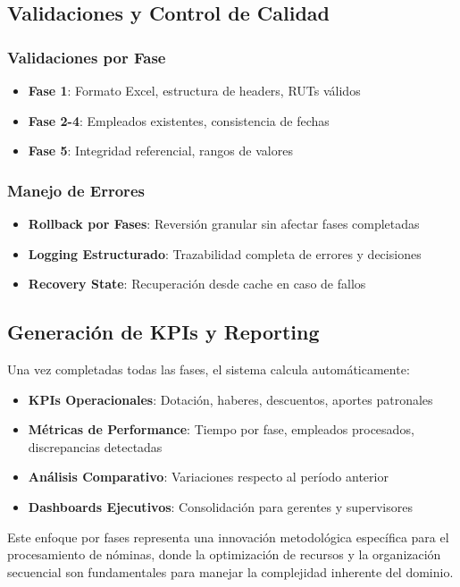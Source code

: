 \subsection{Validaciones y Control de Calidad}

\subsubsection{Validaciones por Fase}
\begin{itemize}
    \item \textbf{Fase 1}: Formato Excel, estructura de headers, RUTs válidos
    \item \textbf{Fase 2-4}: Empleados existentes, consistencia de fechas
    \item \textbf{Fase 5}: Integridad referencial, rangos de valores
\end{itemize}

\subsubsection{Manejo de Errores}
\begin{itemize}
    \item \textbf{Rollback por Fases}: Reversión granular sin afectar fases completadas
    \item \textbf{Logging Estructurado}: Trazabilidad completa de errores y decisiones
    \item \textbf{Recovery State}: Recuperación desde cache en caso de fallos
\end{itemize}

\subsection{Generación de KPIs y Reporting}

Una vez completadas todas las fases, el sistema calcula automáticamente:

\begin{itemize}
    \item \textbf{KPIs Operacionales}: Dotación, haberes, descuentos, aportes patronales
    \item \textbf{Métricas de Performance}: Tiempo por fase, empleados procesados, discrepancias detectadas
    \item \textbf{Análisis Comparativo}: Variaciones respecto al período anterior
    \item \textbf{Dashboards Ejecutivos}: Consolidación para gerentes y supervisores
\end{itemize}

Este enfoque por fases representa una innovación metodológica específica para el procesamiento de nóminas, donde la optimización de recursos y la organización secuencial son fundamentales para manejar la complejidad inherente del dominio.
